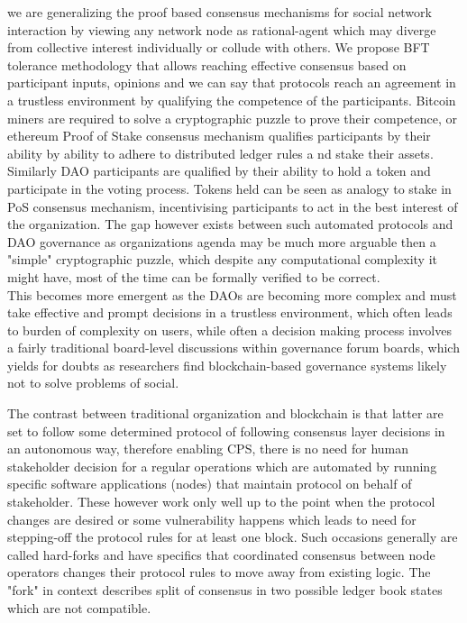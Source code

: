 \documentclass{article}
\begin{document}
\begin{CJK}{UTF8}{gbsn}
\begin{multicols}{2}
        we are generalizing the proof based consensus mechanisms for social network interaction by viewing any network node as rational-agent which may diverge from collective interest \cite{Philip2019} individually or collude with others. We propose BFT tolerance methodology that allows reaching effective consensus based on participant inputs, opinions and  we can say that protocols reach an agreement in a trustless environment by qualifying the competence of the participants. Bitcoin miners are required to solve a cryptographic puzzle to prove their competence, or ethereum Proof of Stake consensus mechanism qualifies participants by their ability by ability to adhere to distributed ledger rules a   nd stake their assets. \\ Similarly DAO participants are qualified by their ability to hold a token and participate in the voting process. Tokens held can be seen as analogy to stake in PoS consensus mechanism, incentivising participants to act in the best interest of the organization. The gap however exists between such automated protocols and DAO governance as organizations agenda may be much more arguable then a "simple" cryptographic puzzle, which despite any computational complexity it might have, most of the time can be formally verified to be correct.\\
        This becomes more emergent as the DAOs are becoming more complex and must take effective and prompt decisions in a trustless environment, which often leads to burden of complexity on users, while often a decision making process involves a fairly traditional board-level discussions within governance forum boards, which yields for doubts as researchers find blockchain-based governance systems likely not to solve problems of social.

        The contrast between traditional organization and blockchain is that latter are set to follow some determined protocol of following consensus layer decisions in an autonomous way, therefore enabling CPS, there is no need for human stakeholder decision for a regular operations which are automated by running specific software applications (nodes) that maintain protocol on behalf of stakeholder.
        These however work only well up to the point when the protocol changes are desired or some vulnerability happens which leads to need for stepping-off the protocol rules for at least one block. Such occasions generally are called hard-forks and have specifics that coordinated consensus between node operators changes their protocol rules to move away from existing logic. The "fork" in context describes split of consensus in two possible ledger book states which are not compatible.\
    \end{multicols}
        
    

    \clearpage\end{CJK}
    
\end{document}
